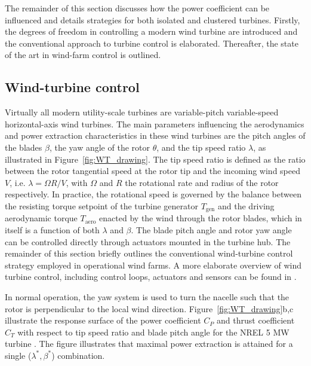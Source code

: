 The remainder of this section discusses how the power coefficient can be influenced and details strategies for both isolated and clustered turbines. Firstly, the degrees of freedom in controlling a modern wind turbine are introduced and the conventional approach to turbine control is elaborated. Thereafter, the state of the art in wind-farm control is outlined. 

\subsection{Wind-turbine control}
Virtually all modern utility-scale turbines are variable-pitch variable-speed horizontal-axis wind turbines. The main parameters influencing the aerodynamics and power extraction characteristics in these wind turbines are the pitch angles of the blades $\beta$, the yaw angle of the rotor $\theta$, and the tip speed ratio $\lambda$, as illustrated in Figure~\ref{fig:WT_drawing}. The tip speed ratio is defined as the ratio between the rotor tangential speed at the rotor tip and the incoming wind speed $V$, i.e.  $\lambda = \Omega R /V$, with $\Omega$ and $R$ the rotational rate and radius of the rotor respectively. In practice, the rotational speed is governed by the balance between the resisting torque setpoint of the turbine generator $T_{\text{gen}}$ and the driving aerodynamic torque $T_{\text{aero}}$ enacted by the wind through the rotor blades, which in itself is a function of both $\lambda$ and $\beta$. The blade pitch angle and rotor yaw angle can be controlled directly through actuators mounted in the turbine hub. The remainder of this section briefly outlines the conventional wind-turbine control strategy employed in operational wind farms. A more elaborate overview of wind turbine control, including control loops, actuators and sensors can be found in \cite{pao2009tutorial}. 

In normal operation, the yaw system is used to turn the nacelle such that the rotor is perpendicular to the local wind direction. Figure~\ref{fig:WT_drawing}b,c illustrate the response surface of the power coefficient $C_P$ and thrust coefficient $C_T$ with respect to tip speed ratio and blade pitch angle for the NREL 5 MW turbine \citep{jonkman2009definition, annoni2016analysis}. The figure illustrates that maximal power extraction is attained for a single ($\lambda^*, \beta^*$) combination.

